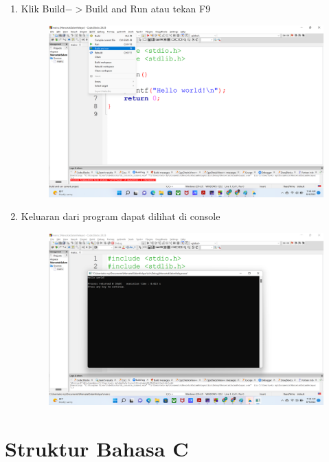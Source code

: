 \begin{enumerate}
\begin{figure}[H]
		      \caption{}
		      \label{fig:screenshot008}
	      \end{figure}
	\item Klik Build$->$Build and Run atau tekan F9
	      \begin{figure}[H]
		      \centering
		      \includegraphics[width=0.7\linewidth]{P1/img/screenshot009.png}
		      \caption{}
		      \label{fig:screenshot009}
	      \end{figure}
	\item Keluaran dari program dapat dilihat di console
	      \begin{figure}[H]
		      \centering
		      \includegraphics[width=0.7\linewidth]{P1/img/screenshot010.png}
		      \caption{}
		      \label{fig:screenshot010}
	      \end{figure}
\end{enumerate}

\section{Struktur Bahasa C}

